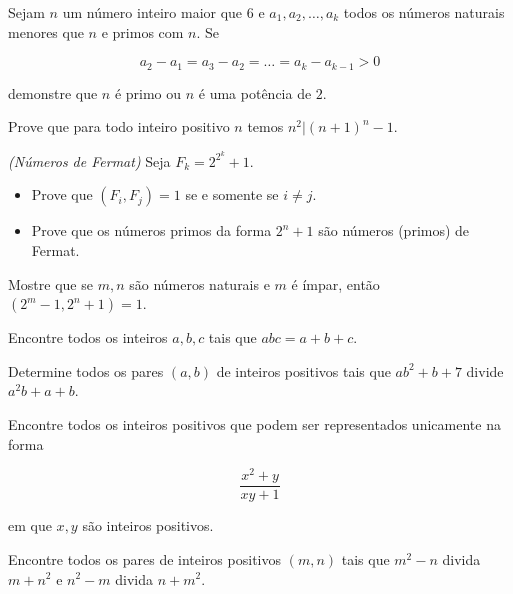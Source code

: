 \begin{questao}
  Sejam $n$ um número inteiro maior que $6$ e $a_1,a_2,\ldots,a_k$
  todos os números naturais menores que $n$ e primos com $n$. Se

  $$ a_2-a_1 = a_3-a_2 = \ldots = a_k-a_{k-1} > 0 $$

  demonstre que $n$ é primo ou $n$ é uma potência de $2$.
\end{questao}

\begin{questao}
  Prove que para todo inteiro positivo $n$ temos
  $n^2|(n+1)^n-1$.
\end{questao}

\begin{questao}
  {\it(Números de Fermat)} Seja $F_k=2^{2^k}+1$.
  \begin{itemize}
    \item Prove que $(F_i,F_j)=1$ se e somente se $i \not= j$.
    \item Prove que os números primos da forma $2^n+1$
    são números (primos) de Fermat.
  \end{itemize}

\end{questao}

\begin{questao}
  Mostre que se $m,n$ são números naturais e $m$ é ímpar,
  então $(2^m-1,2^n+1) = 1$.
\end{questao}

\begin{questao}
  Encontre todos os inteiros $a,b,c$ tais que $abc=a+b+c$.
\end{questao}

\begin{questao}
  Determine todos os pares $(a,b)$ de inteiros positivos
  tais que $ab^2+b+7$ divide $a^2b+a+b$.
\end{questao}

\begin{questao}
  Encontre todos os inteiros positivos que podem ser
  representados unicamente na forma

  $$ \frac{x^2+y}{xy+1} $$

  em que $x,y$ são inteiros positivos.
\end{questao}

\begin{questao}
  Encontre todos os pares de inteiros positivos $(m,n)$ tais
  que $m^2-n$ divida $m+n^2$ e  $n^2-m$ divida $n+m^2$.
\end{questao}

